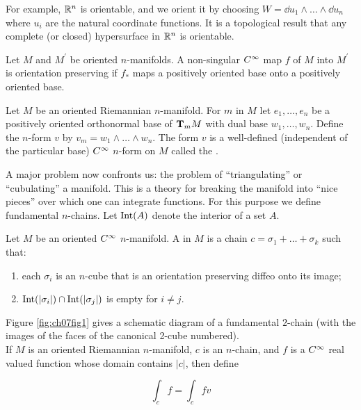 \documentclass[../main]{subfiles}
\begin{document}
For example, $\bbR^{n}$ is orientable, and we orient it by choosing $W=\dd u_{1} \wedge \ldots \wedge \dd u_{n}$ where $u_{i}$ are the natural coordinate functions. It is a topological result that any complete (or closed) hypersurface in $\bbR^n$ is orientable.

Let $M$ and $M^{\prime}$ be oriented $n$-manifolds. A non-singular $\CInfty$ map $f$ of $M$ into $M^{\prime}$ is orientation preserving if $f_\ast$ maps a positively oriented base onto a positively oriented base.

Let $M$ be an oriented Riemannian $n$-manifold. For $m$ in $M$ let $e_1, \ldots, e_{n}$ be a positively oriented orthonormal base of $\tangentspace{M}{m}$ with dual base $w_{1}, \ldots, w_{n}$. Define the $n$-form $v$ by $v_{m} = w_{1} \wedge \ldots \wedge w_{n}$. The form $v$ is a well-defined (independent of the particular base) $\CInfty$ $n$-form on $M$ called the .

A major problem now confronts us: the problem of ``triangulating'' or ``cubulating'' a manifold. This is a theory for breaking the manifold into ``nice pieces'' over which one can integrate functions. For this purpose we define fundamental $n$-chains. Let $\Int(A)$ denote the interior of a set $A$.

Let $M$ be an oriented $\CInfty$ $n$-manifold. A  in $M$ is a chain $c=\sigma_1+\ldots+\sigma_k$ such that: 
\begin{enumerate}[label=(\arabic*)]
    \item each $\sigma_{i}$ is an $n$-cube that is an orientation preserving diffeo onto its image;
    \item $\Int (|\sigma_{i}|) \cap \Int (|\sigma_{j}|)$ is empty for $i \neq j$.
\end{enumerate}
Figure \ref{fig:ch07fig1} gives a schematic diagram of a fundamental $2$-chain (with the images of the faces of the canonical 2-cube numbered).\\



If $M$ is an oriented Riemannian $n$-manifold, $c$ is an $n$-chain, and $f$ is a $\CInfty$ real valued function whose domain contains $|c|$, then define

\begin{equation}\tag{20}\label{eq:ch07.20}
\int_{c} f=\int_{c} f v
\end{equation}
\end{document}
